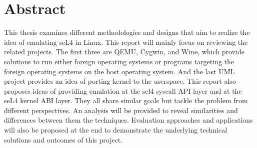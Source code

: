 \chapter*{Abstract}\label{abstract}

This thesis examines different methodologies and designs that aim to realize the idea of emulating seL4 in Linux. This report will mainly focus on reviewing the related projects. The first three are QEMU, Cygwin, and Wine, which provide solutions to run either foreign operating systems or programs targeting the foreign operating systems on the host operating system. And the last UML project provides an idea of porting kernel to the userspace. This report also proposes ideas of providing emulation at the sel4 syscall API layer and at the seL4 kernel ABI layer. They all share similar goals but tackle the problem from different perspectives. An analysis will be provided to reveal similarities and differences between them the techniques. Evaluation approaches and applications will also be proposed at the end to demonstrate the underlying technical solutions and outcomes of this project.